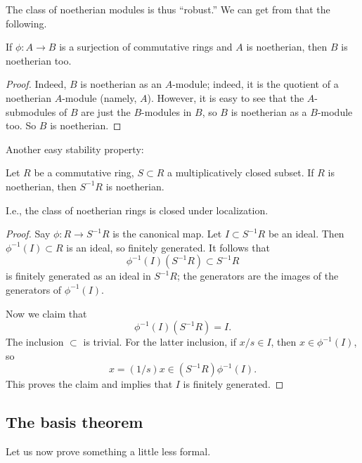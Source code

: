 The class of noetherian modules is thus ``robust.'' We can get from that the
following.

\begin{proposition} 
If $\phi: A \to B$ is a surjection of commutative rings and $A$ is noetherian, then $B$ is
noetherian too.
\end{proposition} 
\begin{proof} 
Indeed, $B$ is noetherian as an $A$-module; indeed, it is the quotient of a
noetherian $A$-module (namely, $A$). However, it is easy to see that the
$A$-submodules of $B$ are just the $B$-modules in $B$, so $B$ is noetherian as a
$B$-module too. So $B$ is noetherian.  
\end{proof} 

Another easy stability property:

\begin{proposition} 
Let $R$ be a commutative ring, $S \subset R$ a multiplicatively closed subset.   If
$R$ is noetherian, then $S^{-1}R$ is noetherian.
\end{proposition} 
I.e., the class of noetherian rings is closed under localization.
\begin{proof} 
Say $\phi: R \to S^{-1}R$ is the canonical map. Let $I \subset S^{-1}R$ be an
ideal. Then $\phi^{-1}(I) \subset R$ is an ideal, so finitely generated. It
follows that
\[ \phi^{-1}(I)( S^{-1}R )\subset S^{-1}R  \]
is finitely generated as an ideal in $S^{-1}R$; the generators are the images
of the generators of $\phi^{-1}(I)$.

Now we claim that
\[  \phi^{-1}(I)( S^{-1}R ) = I . \]
The inclusion $\subset$ is trivial. For the latter inclusion, if $x/s \in I$,
then $x \in \phi^{-1}(I)$, so 
\[ x = (1/s) x \in (S^{-1}R) \phi^{-1}(I).  \] This proves the claim and
implies that $I$ is finitely generated.
\end{proof} 

\subsection{The basis theorem}
Let us now prove something a little less formal.


